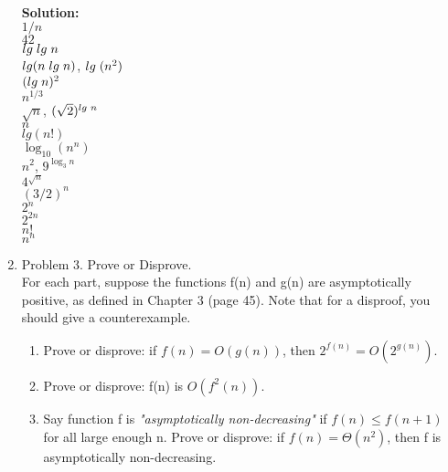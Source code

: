 \documentclass[11pt]{article}
\begin{document}
\begin{enumerate}
    \vspace{0.3cm}\\\textbf{Solution:}
    \\$1/n$
    \\$42$
    \\$lg \hspace{0.1cm}lg\hspace{0.1cm}n$
    \\$lg(n\hspace{0.1 cm} lg\hspace{0.1 cm}n)$, $lg\hspace{0.1 cm} (n^2)$
    \\$(lg \hspace{0.1 cm}n)^2$
    \\$n^{1/3}$
    \\$\sqrt{n}$, $(\sqrt2)^{lg \hspace{0.1 cm} n}$
    \\$n$
    \\$lg(n!)$
    \\$\log _{10} (n^n)$
    \\$n^2$, $9^{\log _{3} n}$
    \\$4^{\sqrt{n}}$
    \\$(3/2)^{n}$
    \\$2^n$
    \\$2^{2n}$
    \\$n!$
    \\$n^{n}$

\item Problem 3. Prove or Disprove.\\
For each part, suppose the functions f(n) and g(n) are asymptotically positive, as defined in Chapter 3 (page 45). Note that for a disproof, you should give a counterexample.
    \begin{enumerate}
        \item Prove or disprove: if $f(n)=O(g(n))$, then $2^{f(n)}=O(2^{g(n)})$.
        
        \item Prove or disprove: f(n) is $O(f^2(n))$.

        \item Say function f is \textit{"asymptotically non-decreasing"} if $f(n)≤f(n+1)$ for all large enough n. Prove or disprove: if $f(n)=Θ(n^2)$, then f is asymptotically non-decreasing.
    \end{enumerate}



\end{enumerate}
\end{document}

